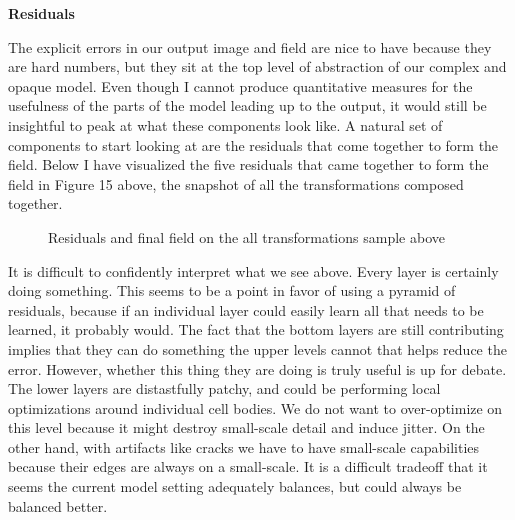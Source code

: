 \documentclass[12pt,a4paper]{article}
\begin{document}
{\bf Residuals}

The explicit errors in our output image and field are nice to have because they are hard numbers, but they sit at the top level of abstraction of our complex and opaque model. Even though I cannot produce quantitative measures for the usefulness of the parts of the model leading up to the output, it would still be insightful to peak at what these components look like. A natural set of components to start looking at are the residuals that come together to form the field. Below I have visualized the five residuals that came together to form the field in Figure 15 above, the snapshot of all the transformations composed together. 

\newpage

\begin{figure}[H]
\centering

\hspace{0mm}
\hspace{0mm}
\hspace{0mm}
\hspace{0mm}
\hspace{0mm}
\hspace{0mm}
\caption{Residuals and final field on the all transformations sample above}
\end{figure}

It is difficult to confidently interpret what we see above. Every layer is certainly doing something. This seems to be a point in favor of using a pyramid of residuals, because if an individual layer could easily learn all that needs to be learned, it probably would. The fact that the bottom layers are still contributing implies that they can do something the upper levels cannot that helps reduce the error. However, whether this thing they are doing is truly useful is up for debate. The lower layers are distastfully patchy, and could be performing local optimizations around individual cell bodies. We do not want to over-optimize on this level because it might destroy small-scale detail and induce jitter. On the other hand, with artifacts like cracks we have to have small-scale capabilities because their edges are always on a small-scale. It is a difficult tradeoff that it seems the current model setting adequately balances, but could always be balanced better. 
\end{document}
